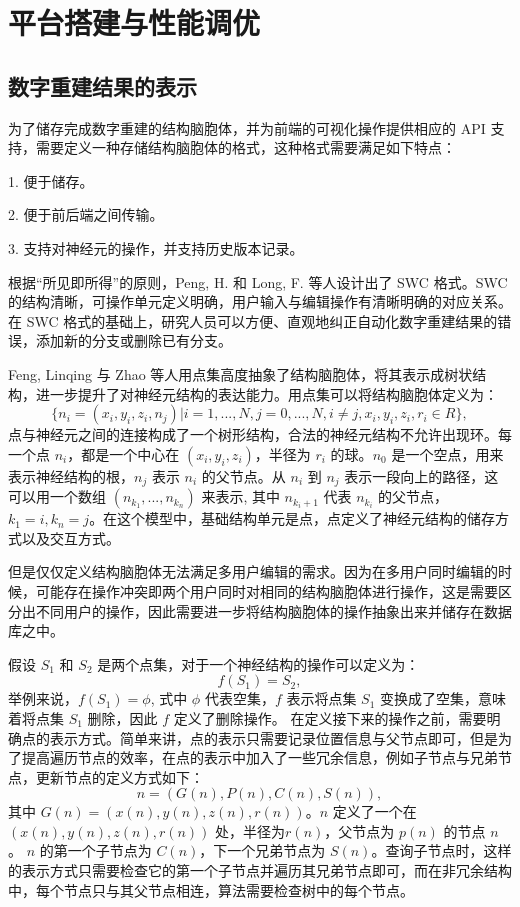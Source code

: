 \chapter{平台搭建与性能调优}
\label{chap3}

\section{数字重建结果的表示}
为了储存完成数字重建的结构脑胞体，并为前端的可视化操作提供相应的 API 支持，需要定义一种存储结构脑胞体的格式，这种格式需要满足如下特点：

1. 便于储存。

2. 便于前后端之间传输。

3. 支持对神经元的操作，并支持历史版本记录。

根据“所见即所得”的原则，Peng, H. 和 Long, F. 等人设计出了 SWC 格式。SWC 的结构清晰，可操作单元定义明确，用户输入与编辑操作有清晰明确的对应关系。在 SWC 格式的基础上，研究人员可以方便、直观地纠正自动化数字重建结果的错误，添加新的分支或删除已有分支。

Feng, Linqing 与 Zhao 等人用点集高度抽象了结构脑胞体，将其表示成树状结构，进一步提升了对神经元结构的表达能力。用点集可以将结构脑胞体定义为：
$$\{ n_i = (x_i, y_i, z_i, n_j) | i = 1,..., N, j = 0,..., N, i \neq j, x_i, y_i, z_i, r_i \in R \},$$
点与神经元之间的连接构成了一个树形结构，合法的神经元结构不允许出现环。每一个点 $n_i$，都是一个中心在 $(x_i, y_i, z_i)$，半径为 $r_i$ 的球。$n_0$ 是一个空点，用来表示神经结构的根，$n_j$ 表示 $n_i$ 的父节点。从 $n_i$ 到 $n_j$ 表示一段向上的路径，这可以用一个数组 $(n_{k_1},...,n_{k_n})$ 来表示, 其中 $n_{k_i+1}$ 代表 $n_{k_i}$ 的父节点， $k_1 = i, k_n = j$。在这个模型中，基础结构单元是点，点定义了神经元结构的储存方式以及交互方式。

但是仅仅定义结构脑胞体无法满足多用户编辑的需求。因为在多用户同时编辑的时候，可能存在操作冲突即两个用户同时对相同的结构脑胞体进行操作，这是需要区分出不同用户的操作，因此需要进一步将结构脑胞体的操作抽象出来并储存在数据库之中。

假设 $S_1$ 和 $S_2$ 是两个点集，对于一个神经结构的操作可以定义为：
$$f(S_1) = S_2,$$
举例来说，$f(S_1)= \phi$, 式中 $\phi$ 代表空集，$f$ 表示将点集 $S_1$ 变换成了空集，意味着将点集 $S_1$ 删除，因此 $f$ 定义了删除操作。
在定义接下来的操作之前，需要明确点的表示方式。简单来讲，点的表示只需要记录位置信息与父节点即可，但是为了提高遍历节点的效率，在点的表示中加入了一些冗余信息，例如子节点与兄弟节点，更新节点的定义方式如下：
$$n=(G(n), P(n), C(n), S(n)),$$
其中 $G(n) = (x(n), y(n), z(n), r(n))$。$n$ 定义了一个在$(x(n), y(n), z(n), r(n))$ 处，半径为$r(n)$，父节点为 $p(n)$ 的节点 $n$。 $n$ 的第一个子节点为 $C(n)$，下一个兄弟节点为 $S(n)$。查询子节点时，这样的表示方式只需要检查它的第一个子节点并遍历其兄弟节点即可，而在非冗余结构中，每个节点只与其父节点相连，算法需要检查树中的每个节点。


